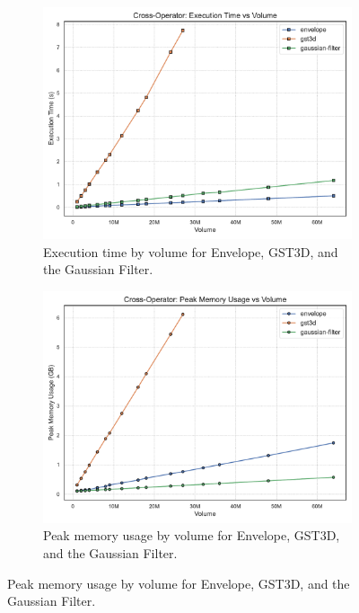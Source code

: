 \begin{figure}[htbp]
    \centering
    \begin{subfigure}[t]{0.49\textwidth}
        \centering
        \includegraphics[width=\textwidth]{assets/images/05/cross_execution_time_by_volume}
        \caption{Execution time by volume for Envelope, \ac{GST3D}, and the Gaussian Filter.}
    \end{subfigure}
    \hfill
    \begin{subfigure}[t]{0.49\textwidth}
        \centering
        \includegraphics[width=\textwidth]{assets/images/05/cross_peak_memory_by_volume}
        \caption{Peak memory usage by volume for Envelope, \ac{GST3D}, and the Gaussian Filter.}
    \end{subfigure}

\end{figure}
